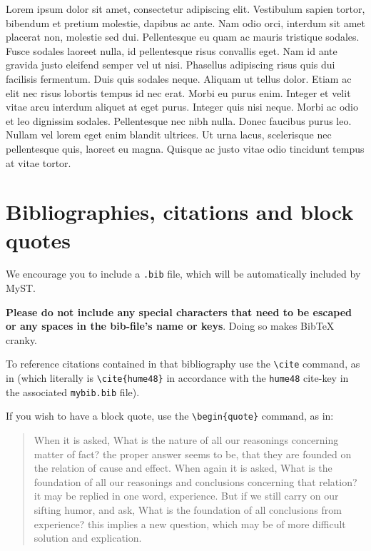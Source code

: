 Lorem ipsum dolor sit amet, consectetur adipiscing elit. Vestibulum sapien
tortor, bibendum et pretium molestie, dapibus ac ante. Nam odio orci, interdum
sit amet placerat non, molestie sed dui. Pellentesque eu quam ac mauris
tristique sodales. Fusce sodales laoreet nulla, id pellentesque risus convallis
eget. Nam id ante gravida justo eleifend semper vel ut nisi. Phasellus
adipiscing risus quis dui facilisis fermentum. Duis quis sodales neque. Aliquam
ut tellus dolor. Etiam ac elit nec risus lobortis tempus id nec erat. Morbi eu
purus enim. Integer et velit vitae arcu interdum aliquet at eget purus. Integer
quis nisi neque. Morbi ac odio et leo dignissim sodales. Pellentesque nec nibh
nulla. Donec faucibus purus leo. Nullam vel lorem eget enim blandit ultrices.
Ut urna lacus, scelerisque nec pellentesque quis, laoreet eu magna. Quisque ac
justo vitae odio tincidunt tempus at vitae tortor.

\section{Bibliographies, citations and block quotes}\label{bibliographies-citations-and-block-quotes}

We encourage you to include a \texttt{.bib} file, which will be automatically included by MyST.

\textbf{Please do not include any special characters that need to be escaped or any spaces in the bib-file's name or keys}. Doing so makes BibTeX cranky.

To reference citations contained in that bibliography use the \verb|\cite| command, as in \citep{hume48} (which literally is \verb|\cite{hume48}| in accordance with the \texttt{hume48} cite-key in the associated \texttt{mybib.bib} file).

If you wish to have a block quote, use the \verb|\begin{quote}| command, as in:

\begin{quote}
    When it is asked, What is the nature of all our reasonings concerning matter of fact? the proper answer seems to be, that they are founded on the relation of cause and effect. When again it is asked, What is the foundation of all our reasonings and conclusions concerning that relation? it may be replied in one word, experience. But if we still carry on our sifting humor, and ask, What is the foundation of all conclusions from experience? this implies a new question, which may be of more difficult solution and explication. \cite{hume48}
\end{quote}

